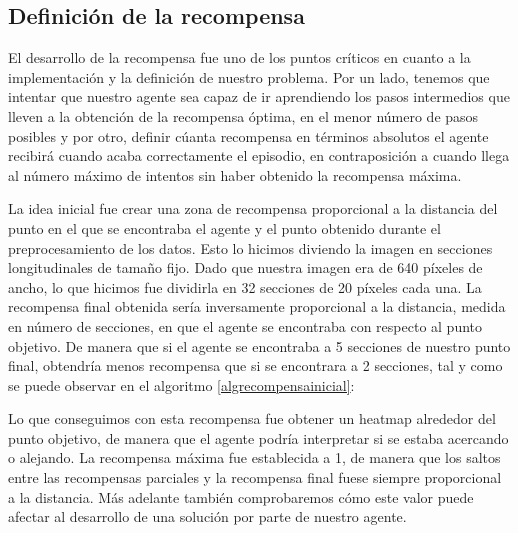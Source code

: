 \subsection{Definición de la recompensa}
\label{definicion-de-recompensa}

El desarrollo de la recompensa fue uno de los puntos críticos en cuanto a la implementación y la definición de nuestro problema. Por un lado, tenemos que intentar que nuestro agente sea capaz de ir aprendiendo los pasos intermedios que lleven a la obtención de la recompensa óptima, en el menor número de pasos posibles y por otro, definir cúanta recompensa en términos absolutos el agente recibirá cuando acaba correctamente el episodio, en contraposición a cuando llega al número máximo de intentos sin haber obtenido la recompensa máxima.
\medskip

La idea inicial fue crear una zona de recompensa proporcional a la distancia del punto en el que se encontraba el agente y el punto obtenido durante el preprocesamiento de los datos. Esto lo hicimos diviendo la imagen en secciones longitudinales de tamaño fijo. Dado que nuestra imagen era de 640 píxeles de ancho, lo que hicimos fue dividirla en 32 secciones de 20 píxeles cada una. La recompensa final obtenida sería inversamente proporcional a la distancia, medida en número de secciones, en que el agente se encontraba con respecto al punto objetivo. De manera que si el agente se encontraba a 5 secciones de nuestro punto final, obtendría menos recompensa que si se encontrara a 2 secciones, tal y como se puede observar en el algoritmo \ref{algrecompensainicial}:
\medskip


\medskip

Lo que conseguimos con esta recompensa fue obtener un heatmap alrededor del punto objetivo, de manera que el agente podría interpretar si se estaba acercando o alejando. La recompensa máxima fue establecida a 1, de manera que los saltos entre las recompensas parciales y la recompensa final fuese siempre proporcional a la distancia. Más adelante también comprobaremos cómo este valor puede afectar al desarrollo de una solución por parte de nuestro agente.
\medskip

